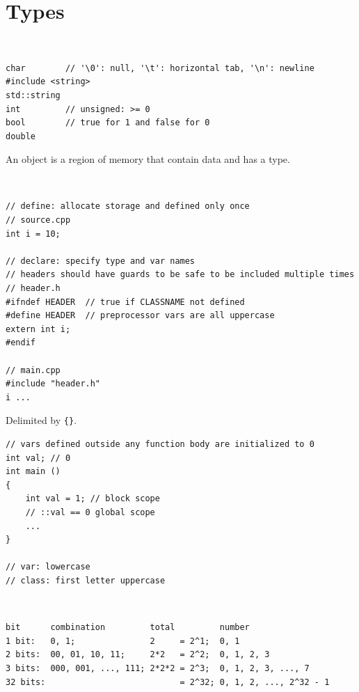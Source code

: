 \documentclass{article}
\begin{document}
\section{Types}
\begin{definition}~
    \begin{verbatim}
char        // '\0': null, '\t': horizontal tab, '\n': newline
#include <string>
std::string
int         // unsigned: >= 0
bool        // true for 1 and false for 0
double
\end{verbatim}
\end{definition}

\begin{definition}[object]
    An object is a region of memory that contain data and has a type.
\end{definition}

\begin{definition}~
    \begin{verbatim}
// define: allocate storage and defined only once
// source.cpp
int i = 10;

// declare: specify type and var names
// headers should have guards to be safe to be included multiple times
// header.h
#ifndef HEADER  // true if CLASSNAME not defined
#define HEADER  // preprocessor vars are all uppercase
extern int i;
#endif

// main.cpp
#include "header.h"
i ...
\end{verbatim}
\end{definition}

\begin{definition}[scope]
    Delimited by \verb|{}|.
    \begin{verbatim}
// vars defined outside any function body are initialized to 0
int val; // 0
int main ()
{
    int val = 1; // block scope
    // ::val == 0 global scope
    ...
}

// var: lowercase
// class: first letter uppercase
\end{verbatim}
\end{definition}

\begin{definition}[bit]~
    \begin{verbatim}
bit      combination         total         number
1 bit:   0, 1;               2     = 2^1;  0, 1
2 bits:  00, 01, 10, 11;     2*2   = 2^2;  0, 1, 2, 3
3 bits:  000, 001, ..., 111; 2*2*2 = 2^3;  0, 1, 2, 3, ..., 7
32 bits:                           = 2^32; 0, 1, 2, ..., 2^32 - 1
\end{verbatim}
\end{definition}
\end{document}
